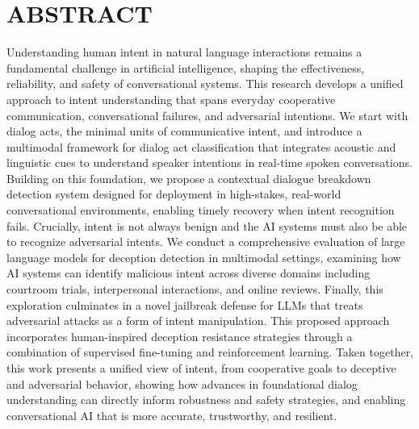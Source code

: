 %
%
%
%  
%

\chapter*{ABSTRACT}

\pagestyle{plain} %
\setcounter{page}{2}

Understanding human intent in natural language interactions remains a fundamental challenge in artificial intelligence, shaping the effectiveness, reliability, and safety of conversational systems. This research develops a unified approach to intent understanding that spans everyday cooperative communication, conversational failures, and adversarial intentions. We start with dialog acts, the minimal units of communicative intent, and introduce a multimodal framework for dialog act classification that integrates acoustic and linguistic cues to understand speaker intentions in real-time spoken conversations. Building on this foundation, we propose a contextual dialogue breakdown detection system designed for deployment in high-stakes, real-world conversational environments, enabling timely recovery when intent recognition fails. Crucially, intent is not always benign and the AI systems must also be able to recognize adversarial intents. We conduct a comprehensive evaluation of large language models for deception detection in multimodal settings, examining how AI systems can identify malicious intent across diverse domains including courtroom trials, interpersonal interactions, and online reviews. Finally, this exploration culminates in a novel jailbreak defense for LLMs that treats adversarial attacks as a form of intent manipulation. This proposed approach incorporates human-inspired deception resistance strategies through a combination of supervised fine-tuning and reinforcement learning. Taken together, this work presents a unified view of intent, from cooperative goals to deceptive and adversarial behavior, showing how advances in foundational dialog understanding can directly inform robustness and safety strategies, and enabling conversational AI that is more accurate, trustworthy, and resilient.
\pagebreak{}

